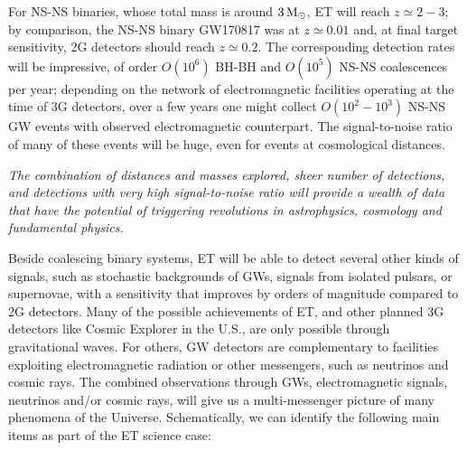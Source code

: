 For NS-NS binaries, whose  total mass is around $3\,\mathrm{M}_{\odot}$,  ET will reach $z\simeq 2-3$; by comparison, the NS-NS binary GW170817 was at $z\simeq 0.01$ and, at final target sensitivity, 2G detectors should reach $z\simeq 0.2$.
The corresponding detection rates will be impressive, of order 
$O(10^6)$ BH-BH and $O(10^5)$ NS-NS
coalescences per year; depending on the network of electromagnetic
facilities operating at the time of 3G detectors, over a few years one might
collect $O(10^2-10^3)$     NS-NS GW events with  observed electromagnetic
counterpart. The signal-to-noise ratio of many of these events will be huge,
even for events at cosmological distances.


\emph{The combination of distances and masses explored, sheer number of detections, and detections with very high signal-to-noise ratio will provide a wealth of data that have the potential of triggering revolutions in astrophysics, cosmology and fundamental physics.} 


Beside coalescing binary systems, ET will be able to detect several other kinds of signals, such as stochastic backgrounds of GWs, signals from isolated pulsars, or supernovae, with a sensitivity that improves by orders of magnitude compared to 2G detectors.
Many of the possible achievements of ET, and other planned 3G detectors like Cosmic Explorer in the U.S., are only possible through gravitational waves. For others, GW detectors are complementary to  facilities exploiting electromagnetic radiation  or other messengers, such as neutrinos and cosmic rays. The combined observations through GWs, electromagnetic signals, neutrinos and/or cosmic rays, will give us a multi-messenger picture of many phenomena of the Universe.
Schematically, we can identify the following main items as part of the ET science case:


